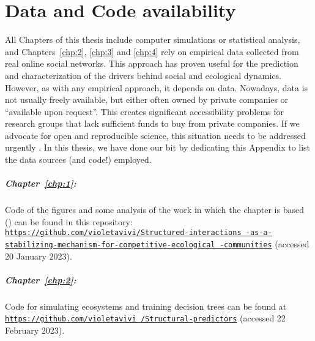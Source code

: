\chapter{Data and Code availability}\label{appen:DataCode}

 All Chapters of this thesis include computer simulations or statistical analysis, and Chapters~\ref{chp:2}, \ref{chp:3} and \ref{chp:4} rely on empirical data collected from real online social networks. This approach has proven useful for the prediction and characterization of the drivers behind social and ecological dynamics. However, as with any empirical approach, it depends on data. Nowadays, data is not usually freely available, but either often owned by private companies or ``available upon request''. This creates significant accessibility problems for research groups that lack sufficient funds to buy from private companies. If we advocate for open and reproducible science, this situation needs to be addressed urgently \cite{lazer2020computational, bartling2014opening}. In this thesis, we have done our bit by dedicating this Appendix to list the data sources (and code!) employed.\\

\paragraph{Chapter~\ref{chp:1}:} Code of the figures and some analysis of the work in which the chapter is based (\cite{calleja2022structured}) can be found in this repository: 
\href{https://github.com/violetavivi/Structured-interactions-as-a-stabilizing-mechanism-for-competitive-ecological-communities}{\texttt{https://github.com/violetavivi/Structured-interactions \newline -as-a-stabilizing-mechanism-for-competitive-ecological \newline -communities}} (accessed 20 January 2023).

\paragraph{Chapter~\ref{chp:2}:} Code for simulating ecosystems and training decision trees can be found at \href{https://github.com/violetavivi/Structural-predictors}{\texttt{https://github.com/violetavivi \newline /Structural-predictors}} (accessed 22 February 2023).


